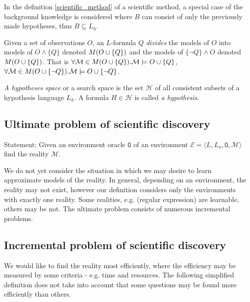 \begin{remark}
In the definition \ref{scientific_method} of a scientific method, a special case of the background knowledge is considered where $B$ can consist of only the previously made hypotheses, thus $B \subseteq L_h$.
\end{remark}

\begin{note}
Given a set of observations $O$, an $L$-formula $Q$ \emph{divides} the models of $O$ into models of $O \wedge \{Q\}$ denoted $M(O \cup \{Q\})$ and the models of $\{\neg Q\} \wedge O$ denoted $M(O \cup \{Q\})$. That is $\forall \mathcal{M} \in M(O \cup \{Q\}). \mathcal{M} \models O \cup \{Q\}$,
$\forall \mathcal{M} \in M(O \cup \{\neg Q\}). \mathcal{M} \models O \cup \{\neg Q\}$.
\end{note}

\begin{defn}
\emph{A hypotheses space} or a search space is the set $\mathcal{H}$ of all consistent subsets of a hypothesis language $L_h$. A formula $H \in \mathcal{H}$ is called \emph{a hypothesis}.
\end{defn}

\subsection{Ultimate problem of scientific discovery}
Statement: Given an environment oracle $\mathtt{O}$ of an environment $\mathcal{E}=\langle L, L_o, \mathtt{O}, \mathcal{M} \rangle$ find the reality $\mathcal{M}$.

We do not yet consider the situation in which we may desire to learn approximate models of the reality. In general, depending on an environment, the reality may not exist, however our definition considers only the environments with exactly one reality. Some realities, e.g. (regular expression) are learnable, others may be not. The ultimate problem consists of numerous incremental problems.

\subsection{Incremental problem of scientific discovery}
We would like to find the reality most efficiently, where the efficiency may be measured by some criteria - e.g. time and resources. The following simplified definition does not take into account that some questions may be found more efficiently than others.

